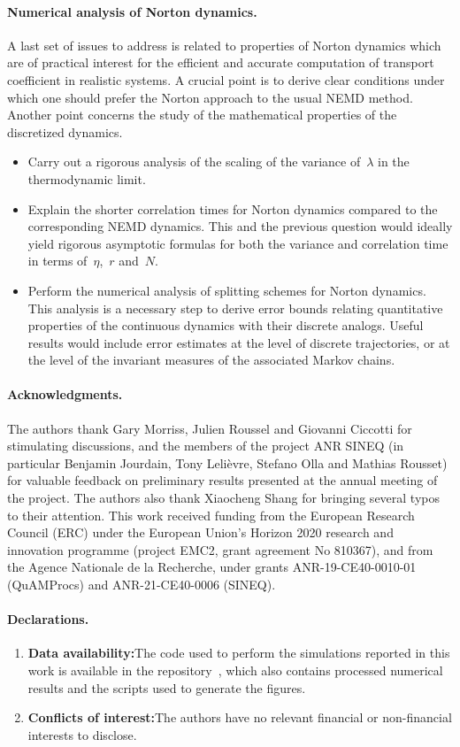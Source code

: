 \paragraph{Numerical analysis of Norton dynamics.}
A last set of issues to address is related to properties of Norton dynamics which are of practical interest for the efficient and accurate computation of transport coefficient in realistic systems. A crucial point is to derive clear conditions under which one should prefer the Norton approach to the usual NEMD method. Another point concerns the study of the mathematical properties of the discretized dynamics.
\begin{itemize}
    \item Carry out a rigorous analysis of the scaling of the variance of~$\lambda$ in the thermodynamic limit.
    \item Explain the shorter correlation times for Norton dynamics compared to the corresponding NEMD dynamics. This and the previous question would ideally yield rigorous asymptotic formulas for both the variance and correlation time in terms of~$\eta$,~$r$ and~$N$.
    \item Perform the numerical analysis of splitting schemes for Norton dynamics. This analysis is a necessary step to derive error bounds relating quantitative properties of the continuous dynamics with their discrete analogs. Useful results would include error estimates at the level of discrete trajectories, or at the level of the invariant measures of the associated Markov chains.
\end{itemize}

\paragraph{Acknowledgments.}
The authors thank Gary Morriss, Julien Roussel and Giovanni Ciccotti for stimulating discussions, and the
members of the project ANR SINEQ (in particular Benjamin Jourdain, Tony
Lelièvre, Stefano Olla and Mathias Rousset) for valuable feedback on preliminary
results presented at the annual meeting of the project.
The authors also thank Xiaocheng Shang for bringing several typos to their attention.
This work received funding from the European Research Council (ERC) under the
European Union's Horizon 2020 research and innovation programme (project
EMC2, grant agreement No 810367), and from the Agence Nationale de la
Recherche, under grants ANR-19-CE40-0010-01 (QuAMProcs) and
ANR-21-CE40-0006 (SINEQ).
\paragraph{Declarations.}
\begin{enumerate}[]
    \item \textbf{Data availability:}{The code used to perform the simulations reported in this work is available in the repository~\cite{githubnorton}, which also contains processed numerical results and the scripts used to generate the figures. }
    \item \textbf{Conflicts of interest:}{The authors have no relevant financial or non-financial interests to disclose.}
\end{enumerate}   

